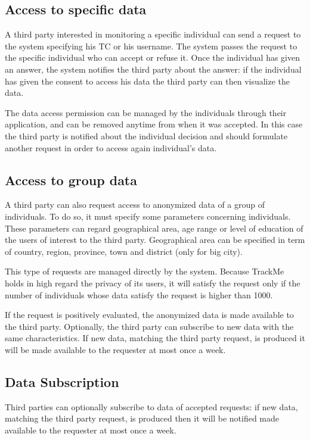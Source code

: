 \subsection{Access to specific data}
A third party interested in monitoring a specific individual can send a request to the system specifying his TC or his username.
The system passes the request to the specific individual who can accept or refuse it.
Once the individual has given an answer, the system notifies the third party about the answer: if the individual has given the consent to access his data the third party can then visualize the data.

The data access permission can be managed by the individuals through their application, and can be removed anytime from when it was accepted. 
In this case the third party is notified about the individual decision and should formulate another request in order to access again individual's data. 




\subsection{Access to group data}
A third party can also request access to anonymized data of a group of individuals.
To do so, it must specify some parameters concerning individuals. These parameters can regard geographical area, age range or level of education of the users of interest to the third party.
Geographical area can be specified in term of country, region, province, town and district (only for big city).

This type of requests are managed directly by the system. Because TrackMe holds in high regard the privacy of its users, it will satisfy the request only if the number of individuals whose data satisfy the request is higher than 1000.

If the request is positively evaluated, the anonymized data is made available to the third party.
Optionally, the third party can subscribe to new data with the same characteristics. If new data, matching the third party request, is produced it will be made available to the requester at most once a week.

\subsection{Data Subscription}
Third parties can optionally subscribe to data of accepted requests: if new data, matching the third party request, is produced then it will be notified made available to the requester at most once a week.

